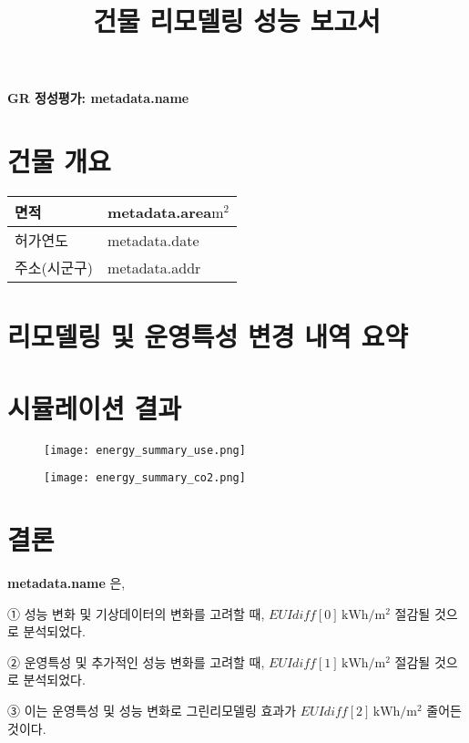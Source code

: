 \documentclass[a4paper,10pt]{article}
\title{건물 리모델링 성능 보고서}
\begin{document}
\begin{center}
    \Large\bfseries GR 정성평가: {{metadata.name}}
\end{center}


\section{건물 개요}


\setlength{\tabcolsep}{0pt}
\renewcommand{\arraystretch}{1.3}

\begin{table}[h!]
\centering
\begin{tabular}{L|C}
\hline
면적 & {{metadata.area}}$\mathrm{m^2}$ \\ \hline
허가연도 & {{metadata.date}} \\ \hline
주소(시군구) & {{metadata.addr}} \\ \hline
\end{tabular}
\end{table}

\section{리모델링 및 운영특성 변경 내역 요약}

\section{시뮬레이션 결과}
\begin{figure}[h!]
    \centering
    \begin{minipage}[b]{0.49\textwidth}
        \texttt{[image: energy\_summary\_use.png]}
    \end{minipage}
    \hfill
    \begin{minipage}[b]{0.49\textwidth}
        \texttt{[image: energy\_summary\_co2.png]}
    \end{minipage}
\end{figure}


\section{결론}
\begin{tcolorbox}[colback=gray!5,colframe=black!60,boxrule=0.6pt,
                  left=4mm,right=4mm,top=2mm,bottom=2mm]
\textbf{ {{metadata.name}} }은,

① 성능 변화 및 기상데이터의 변화를 고려할 때, \textbf{\underline{${{EUIdiff[0]}}\,\mathrm{kWh/m^2}$}} 절감될 것으로 분석되었다.

② 운영특성 및 추가적인 성능 변화를 고려할 때, 
\underline{${{EUIdiff[1]}}\,\mathrm{kWh/m^2}$} 절감될 것으로 분석되었다. 

③ 이는 운영특성 및 성능 변화로 그린리모델링 효과가 
\underline{${{EUIdiff[2]}}\,\mathrm{kWh/m^2}$} 줄어든 것이다.
\end{tcolorbox}
\end{document}
